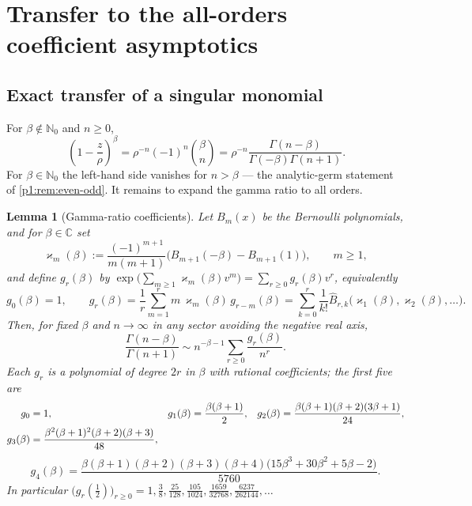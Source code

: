 \documentclass[11pt,a4paper,oneside]{book}
\theoremstyle{plain}
\newtheorem{lemma}[theorem]{Lemma}
\theoremstyle{definition}
\theoremstyle{remark}
\newcommand{\Nat}{\mathbb{N}}
\newcommand{\Cplx}{\mathbb{C}}
\newcommand{\Coef}[1]{[#1]\,}
\newcommand{\OB}{\widehat{B}}
\begin{document}
\section{Transfer to the all-orders coefficient asymptotics}
\label{p1:sec:forward}

\subsection{Exact transfer of a singular monomial}

For $\beta\notin\Nat_0$ and $n\ge0$,
\begin{equation}
 \Coef{z^{n}}\left(1-\frac z\rho\right)^{\beta}
 =\rho^{-n}(-1)^{n}\binom{\beta}{n}
 =\rho^{-n}\frac{\Gamma(n-\beta)}{\Gamma(-\beta)\Gamma(n+1)} .
 \label{p1:eq:exact-transfer}
\end{equation}
For $\beta\in\Nat_0$ the left-hand side vanishes for $n>\beta$ --- the analytic-germ statement
of \cref{p1:rem:even-odd}.  It remains to expand the gamma ratio to all orders.

\begin{lemma}[Gamma-ratio coefficients]
\label{p1:lem:gamma-ratio}
Let $B_m(x)$ be the Bernoulli polynomials, and for $\beta\in\Cplx$ set
\begin{equation}
 \varkappa_m(\beta):=\frac{(-1)^{m+1}}{m(m+1)}
 \bigl(B_{m+1}(-\beta)-B_{m+1}(1)\bigr),\qquad m\ge1,
 \label{p1:eq:varkappa}
\end{equation}
and define $g_r(\beta)$ by
$\exp\bigl(\sum_{m\ge1}\varkappa_m(\beta)v^{m}\bigr)=\sum_{r\ge0}g_r(\beta)v^{r}$,
equivalently
\begin{equation}
 g_0(\beta)=1,\qquad
 g_r(\beta)=\frac1r\sum_{m=1}^{r}m\,\varkappa_m(\beta)\,g_{r-m}(\beta)
 =\sum_{k=0}^{r}\frac1{k!}\OB_{r,k}
 \bigl(\varkappa_1(\beta),\varkappa_2(\beta),\ldots\bigr).
 \label{p1:eq:g-recurrence}
\end{equation}
Then, for fixed $\beta$ and $n\to\infty$ in any sector avoiding the negative real axis,
\begin{equation}
 \frac{\Gamma(n-\beta)}{\Gamma(n+1)}
 \sim n^{-\beta-1}\sum_{r\ge0}\frac{g_r(\beta)}{n^{r}} .
 \label{p1:eq:gamma-ratio}
\end{equation}
Each $g_r$ is a polynomial of degree $2r$ in $\beta$ with rational coefficients; the first
five are
\begin{align}
 g_0&=1,
 &g_1(\beta)&=\frac{\beta(\beta+1)}2,
 &g_2(\beta)&=\frac{\beta(\beta+1)(\beta+2)(3\beta+1)}{24},
 \notag\\
 g_3(\beta)&=\frac{\beta^{2}(\beta+1)^{2}(\beta+2)(\beta+3)}{48},
 \label{p1:eq:g-first}
\end{align}
\begin{equation}
 g_4(\beta)=\frac{\beta(\beta+1)(\beta+2)(\beta+3)(\beta+4)
 \bigl(15\beta^{3}+30\beta^{2}+5\beta-2\bigr)}{5760}.
 \label{p1:eq:g4}
\end{equation}
In particular $\bigl(g_r(\tfrac12)\bigr)_{r\ge0}
=1,\tfrac38,\tfrac{25}{128},\tfrac{105}{1024},
\tfrac{1659}{32768},\tfrac{6237}{262144},\ldots$
\end{lemma}
\end{document}
